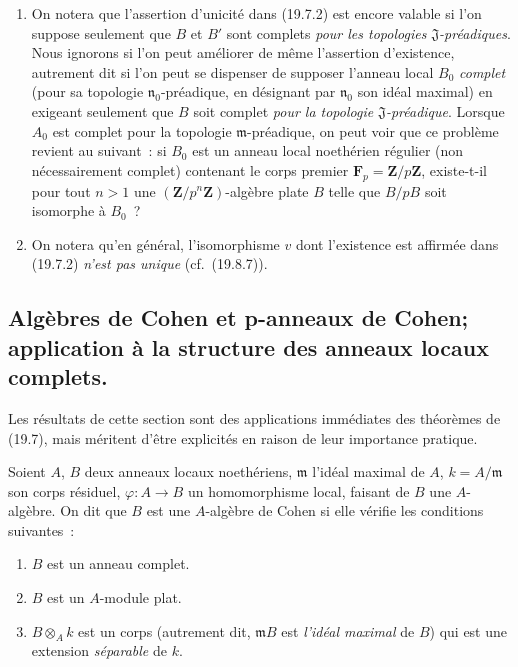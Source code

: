 \begin{remarks}[19.7.3]
\label{0.19.7.3-fr}
\begin{enumerate}
  \item[(i)] On notera que l'assertion d'unicité dans (19.7.2) est encore
  valable si l'on suppose seulement que $B$ et $B'$ sont complets \emph{pour
  les topologies $\mathfrak J$-préadiques}. Nous ignorons si l'on peut
  améliorer de même l'assertion d'existence, autrement dit si l'on peut se
  dispenser de supposer l'anneau local $B_0$ \emph{complet} (pour sa topologie
  $\mathfrak n_0$-préadique, en désignant par $\mathfrak n_0$ son idéal
  maximal) en exigeant seulement que $B$ soit complet \emph{pour la topologie
  $\mathfrak J$-préadique}. Lorsque $A_0$ est complet pour la topologie
  $\mathfrak m$-préadique, on peut voir que ce problème revient au suivant~:
  si $B_0$ est un anneau local noethérien régulier (non nécessairement
  complet) contenant le corps premier $\mathbf F_p=\mathbf Z/p\mathbf Z$,
  existe-t-il pour tout $n>1$ une $(\mathbf Z/p^n\mathbf Z)$-algèbre plate $B$
  telle que $B/pB$ soit isomorphe à $B_0$~?
  \item[(ii)] On notera qu'en général, l'isomorphisme $v$ dont l'existence est
  affirmée dans (19.7.2) \emph{n'est pas unique} (cf.~(19.8.7)).
\end{enumerate}
\end{remarks}

\subsection{Algèbres de Cohen et p-anneaux de Cohen; application à la
structure des anneaux locaux complets.}
\label{subsection:0.19.8-fr}

Les résultats de cette section sont des applications immédiates des théorèmes
de (19.7), mais méritent d'être explicités en raison de leur importance
pratique.

\begin{definition}[19.8.1]
\label{0.19.8.1-fr}
Soient $A$, $B$ deux anneaux locaux noethériens, $\mathfrak m$ l'idéal maximal
de $A$, $k=A/\mathfrak m$ son corps résiduel,
$\varphi:A\to B$ un homomorphisme local, faisant de $B$ une $A$-algèbre. On
dit que $B$ est une $A$-algèbre de Cohen si elle vérifie les conditions
suivantes~:
\begin{enumerate}
  \item[(i)] $B$ est un anneau complet.
  \item[(ii)] $B$ est un $A$-module plat.
  \item[(iii)] $B\otimes_A k$ est un corps \textup{(autrement dit,
  $\mathfrak mB$ est \emph{l'idéal maximal} de $B$)} qui est une extension
  \emph{séparable} de $k$.
\end{enumerate}
\end{definition}

